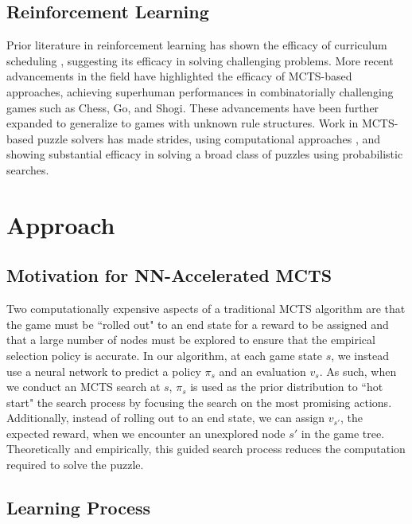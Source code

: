 \documentclass[10pt, reqno, letterpaper, twoside]{amsart}
\begin{document}
\subsection{Reinforcement Learning}

Prior literature in reinforcement learning has shown the efficacy of curriculum scheduling \cite{10.24963/ijcai.2017/757}, suggesting its efficacy in solving challenging problems.  More recent advancements in the field \cite{Silver2018} have highlighted the efficacy of MCTS-based approaches, achieving superhuman performances in combinatorially challenging games such as Chess, Go, and Shogi.  These advancements have been further expanded \cite{Schrittwieser_2020} to generalize to games with unknown rule structures. Work in MCTS-based puzzle solvers has made strides, using computational approaches  \cite{Kiarostami2021}, and showing substantial efficacy in solving a broad class of puzzles using probabilistic searches. 

\section{Approach}
\subsection{Motivation for NN-Accelerated MCTS}

Two computationally expensive aspects of a traditional MCTS algorithm are that the game must be ``rolled out" to an end state for a reward to be assigned and that a large number of nodes must be explored to ensure that the empirical selection policy is accurate. In our algorithm, at each game state $s$, we instead use a neural network to predict a policy $\pi_s$  and an evaluation $v_s$. As such, when we conduct an MCTS search at $s$, $\pi_s$ is used as the prior distribution to ``hot start" the search process by focusing the search on the most promising actions. Additionally, instead of rolling out to an end state, we can assign $v_{s'}$, the expected reward, when we encounter an unexplored node $s'$ in the game tree. Theoretically and empirically, this guided search process reduces the computation required to solve the puzzle. 

\subsection{Learning Process}
\end{document}
